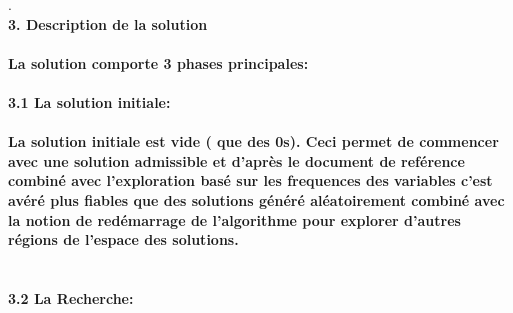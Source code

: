 \documentclass[20pt, a4paper, french]{report}
\begin{document}
\newpage
.\\
\bfseries{\Huge 3. Description de la solution}\\\\
{\large
La solution comporte 3 phases principales: \\\\
}
\bfseries{\LARGE 3.1 La solution initiale: }\\\\
\large{
La solution initiale est vide ( que des 0s). Ceci permet de commencer avec une solution admissible et  d'après le document de reférence combiné avec l'exploration basé sur les frequences des variables c'est avéré plus fiables que des solutions généré aléatoirement combiné avec la notion de redémarrage de l'algorithme pour explorer d'autres régions de l'espace des solutions.\\\\\\    
}
\bfseries{\LARGE 3.2 La Recherche: }\\\\
\end{document}
